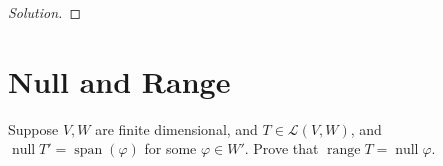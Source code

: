 \documentclass{article}
\newenvironment{solution}{\begin{proof}[Solution]}{\end{proof}}
\DeclareMathOperator*{\vspan}{\mathrm{span}}
\DeclareMathOperator*{\vnull}{\mathrm{null}}
\DeclareMathOperator*{\vrange}{\mathrm{range}}
\begin{document}
\begin{solution}
\begin{comment}
		However, we note here that $\dim (U \cap W) \leq \min(\dim U, \dim W)$, which implies then that $\dim (U \cap W) \leq \dim (U + W)$.
		
		Then, it follows that
		\begin{equation*}
			\dim (U \cap W)^{0} \geq \dim (U^{0} + W^{0}).
		\end{equation*}
	
		Then, since we know that $(U \cap W)^{0} \subseteq U^{0} + W^{0}$, and that $\dim (U \cap W)^{0} \geq \dim (U^{0} + W^{0})$, it must be then that they are in fact equal.
		\end{comment}
	\end{solution}
	
	\newpage
	
	\section{Null and Range}
	\begin{hw}
		Suppose $V,W$ are finite dimensional, and $T \in \mathcal L(V,W)$, and $\vnull T' = \vspan (\varphi)$ for some $\varphi \in W'$. Prove that $\vrange T = \vnull \varphi$. 
	\end{hw}
\end{document}
